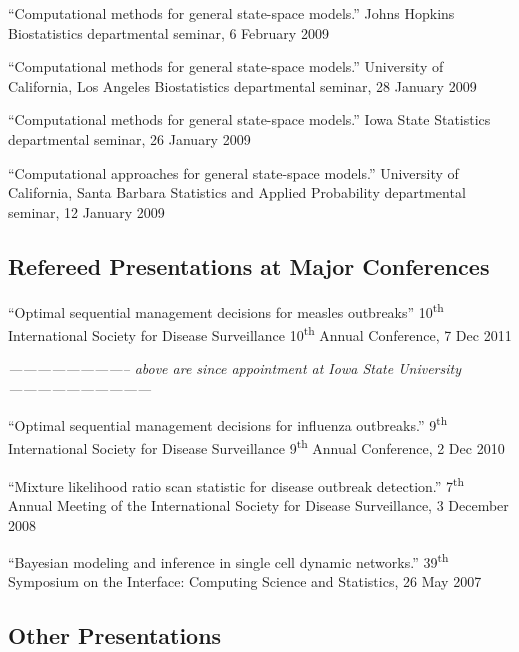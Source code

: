 \documentclass[overlapped,line]{res}
\newcommand{\sinceappt}{\emph{-------------------------- above are since appointment at Iowa State University ------------------------------}}
\newcommand{\sinceappt}{}
\begin{document}
\begin{resume}
{``Computational methods for general state-space models.'' Johns Hopkins Biostatistics departmental seminar, 6 February 2009 

``Computational methods for general state-space models.'' University of California, Los Angeles Biostatistics departmental seminar, 28 January 2009 

``Computational methods for general state-space models.'' Iowa State Statistics  departmental seminar, 26 January 2009 

``Computational approaches for general state-space models.'' University of California, Santa Barbara Statistics and Applied Probability departmental seminar, 12 January 2009 
}

\subsection{\bf Refereed Presentations at Major Conferences} \vspace{-0.2in}

{\small 

``Optimal sequential management decisions for measles outbreaks'' 10\textsuperscript{th} International Society for Disease Surveillance 10\textsuperscript{th} Annual Conference, 7 Dec 2011 

\sinceappt

``Optimal sequential management decisions for influenza outbreaks.'' 9\textsuperscript{th} International Society for Disease Surveillance 9\textsuperscript{th} Annual Conference, 2 Dec 2010 

``Mixture likelihood ratio scan statistic for disease outbreak detection.'' 7\textsuperscript{th} Annual Meeting of the International Society for Disease Surveillance, 3 December 2008 

``Bayesian modeling and inference in single cell dynamic networks.'' 39\textsuperscript{th} Symposium on the Interface: Computing Science and Statistics, 26 May 2007 

}

\subsection{\bf Other Presentations} \vspace{-0.2in}

%


\end{resume}
\end{document}
